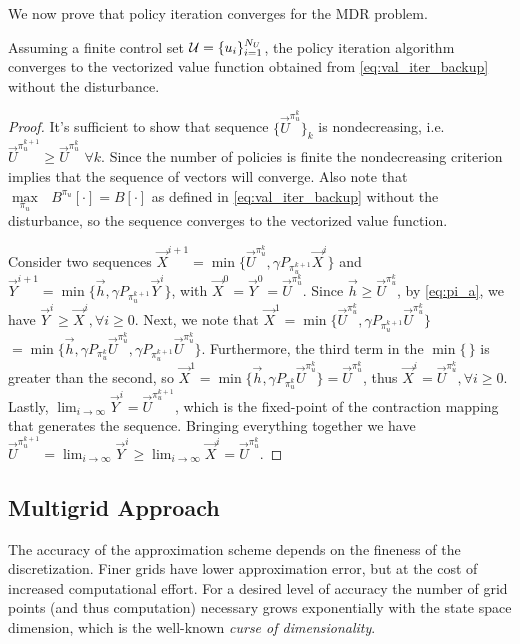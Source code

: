 We now prove that policy iteration converges for the MDR problem.
%
\begin{proposition}
Assuming a finite control set ${\mathcal{U}=\{u_i\}_{i=1}^{N_U}}$, the policy iteration algorithm converges to the vectorized value function obtained from \eqref{eq:val_iter_backup} without the disturbance.
\end{proposition}%
\noindent \begin{proof}
It's sufficient to show that sequence ${\{ \vec{U}^{\pi_u^{k}}\}}_k$ is nondecreasing, i.e. $\vec{U}^{\pi_u^{k+1}} \geq \vec{U}^{\pi_u^k}$ $\forall k$. Since the number of policies is finite the nondecreasing criterion implies that the sequence of vectors will converge. Also note that $\underset{\pi_u}{\max}\text{ }B^{\pi_u}[\cdot] = B[\cdot]$ as defined in \eqref{eq:val_iter_backup} without the disturbance, so the sequence converges to the vectorized value function.

Consider two sequences ${\vec{X}^{i+1}=\min\big\{\vec{U}^{\pi_u^k}, \gamma P_{\pi_u^{k+1}}\vec{X}^i \big\}}$ and ${\vec{Y}^{i+1}=\min\big\{\vec{h}, \gamma P_{\pi_u^{k+1}} \vec{Y}^i \big\}}$, with ${\vec{X}^0=\vec{Y}^0=\vec{U}^{\pi_u^k}}$.
Since ${\vec{h}\geq \vec{U}^{\pi_u^k}}$, by \eqref{eq:pi_a}, we have ${\vec{Y}^i \geq \vec{X}^i,\forall i \geq 0}$.
Next, we note that ${\vec{X}^{1}=\min\big\{\vec{U}^{\pi_u^k},\gamma P_{\pi_u^{k+1}}\vec{U}^{\pi_u^k}\big\}}$ ${=\min\big\{\vec{h}, \gamma P_{\pi_u^{k}}\vec{U}^{\pi_u^k},\gamma P_{\pi_u^{k+1}}\vec{U}^{\pi_u^k}\big\}}$.
Furthermore, the third term in the $\min\{\,\}$ is greater than the second, so $\vec{X}^{1}=\min\big\{\vec{h}, \gamma P_{\pi_u^{k}}\vec{U}^{\pi_u^k} \big\} =  \vec{U}^{\pi_u^k}$, thus ${\vec{X}^{i} =  \vec{U}^{\pi_u^k},\forall i \geq 0}$.
Lastly, $\lim_{i\rightarrow \infty}\vec{Y}^i= \vec{U}^{\pi_u^{k+1}}$, which is the fixed-point of the contraction mapping that generates the sequence.
Bringing everything together we have $\vec{U}^{\pi_u^{k+1}} = \lim_{i\rightarrow \infty}\vec{Y}^i \geq   \lim_{i\rightarrow \infty}\vec{X}^i = \vec{U}^{\pi_u^{k}}.$
\end{proof}



\subsection{Multigrid Approach}

The accuracy of the approximation scheme depends on the fineness of the discretization. Finer grids have lower approximation error, but at the cost of increased computational effort. For a desired level of accuracy the number of grid points (and thus computation) necessary grows exponentially with the state space dimension, which is the well-known \emph{curse of dimensionality}. 

